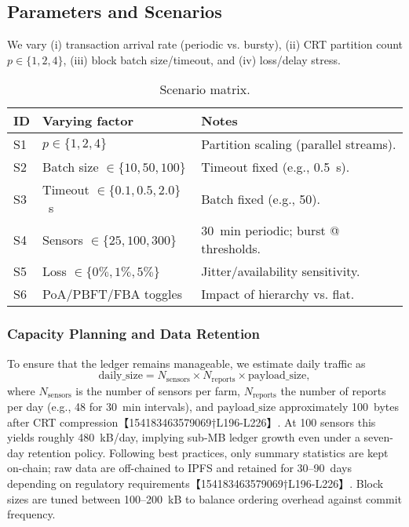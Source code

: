 \documentclass[12pt,onecolumn]{IEEEtran} %
\begin{document}
\subsection{Parameters and Scenarios}
We vary (i) transaction arrival rate (periodic vs. bursty), (ii) CRT partition count $p\in\{1,2,4\}$, (iii) block batch size/timeout, and (iv) loss/delay stress.
\begin{table}[!t]
  \centering
  \caption{Scenario matrix.}
  \label{tab:scenarios}
  \begin{tabular}{lll}
    \toprule
    ID & Varying factor & Notes \\
    \midrule
    S1 & $p\in\{1,2,4\}$ & Partition scaling (parallel streams). \\
    S2 & Batch size $\in\{10,50,100\}$ & Timeout fixed (e.g., 0.5~s). \\
    S3 & Timeout $\in\{0.1,0.5,2.0\}$~s & Batch fixed (e.g., 50). \\
    S4 & Sensors $\in\{25,100,300\}$ & 30~min periodic; burst @ thresholds. \\
    S5 & Loss $\in\{0\%,1\%,5\%\}$ & Jitter/availability sensitivity. \\
    S6 & PoA/PBFT/FBA toggles & Impact of hierarchy vs. flat. \\
    \bottomrule
  \end{tabular}
\end{table}

\subsubsection{Capacity Planning and Data Retention}
To ensure that the ledger remains manageable, we estimate daily traffic as
\begin{equation}
  \text{daily\_size} = N_{\text{sensors}} \times N_{\text{reports}} \times \text{payload\_size},
\end{equation}
where $N_{\text{sensors}}$ is the number of sensors per farm, $N_{\text{reports}}$ the number of reports per day (e.g., 48 for 30~min intervals), and $\text{payload\_size}$ approximately 100~bytes after CRT compression【154183463579069†L196-L226】.  At 100 sensors this yields roughly 480~kB/day, implying sub-MB ledger growth even under a seven-day retention policy.  Following best practices, only summary statistics are kept on-chain; raw data are off-chained to IPFS and retained for 30–90~days depending on regulatory requirements【154183463579069†L196-L226】.  Block sizes are tuned between 100–200~kB to balance ordering overhead against commit frequency.
\end{document}
